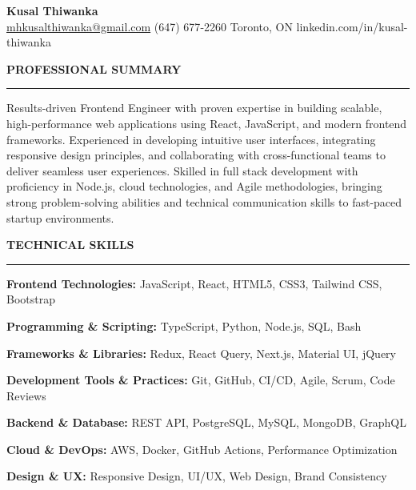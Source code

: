 \documentclass[10pt,letterpaper]{article}
\begin{document}
\begin{center}
{\LARGE\textbf{Kusal Thiwanka}}\\[3pt]
\href{mailto:mhkusalthiwanka@gmail.com}{mhkusalthiwanka@gmail.com}\hspace{2em}%
(647) 677{-}2260\hspace{2em}%
Toronto, ON\hspace{2em}
linkedin.com/in/kusal-thiwanka
\end{center}

\vspace{6pt}

\textbf{PROFESSIONAL SUMMARY}\\[-8pt]
\noindent\rule{\textwidth}{1pt}

\vspace{-2pt}

Results-driven Frontend Engineer with proven expertise in building scalable, high-performance web applications using React, JavaScript, and modern frontend frameworks. Experienced in developing intuitive user interfaces, integrating responsive design principles, and collaborating with cross-functional teams to deliver seamless user experiences. Skilled in full stack development with proficiency in Node.js, cloud technologies, and Agile methodologies, bringing strong problem-solving abilities and technical communication skills to fast-paced startup environments.

\vspace{8pt}

\textbf{TECHNICAL SKILLS}\\[-8pt]
\noindent\rule{\textwidth}{1pt}

\vspace{-2pt}

\textbf{Frontend Technologies:} JavaScript, React, HTML5, CSS3, Tailwind CSS, Bootstrap

\textbf{Programming \& Scripting:} TypeScript, Python, Node.js, SQL, Bash

\textbf{Frameworks \& Libraries:} Redux, React Query, Next.js, Material UI, jQuery

\textbf{Development Tools \& Practices:} Git, GitHub, CI/CD, Agile, Scrum, Code Reviews

\textbf{Backend \& Database:} REST API, PostgreSQL, MySQL, MongoDB, GraphQL

\textbf{Cloud \& DevOps:} AWS, Docker, GitHub Actions, Performance Optimization

\textbf{Design \& UX:} Responsive Design, UI/UX, Web Design, Brand Consistency
\end{document}
